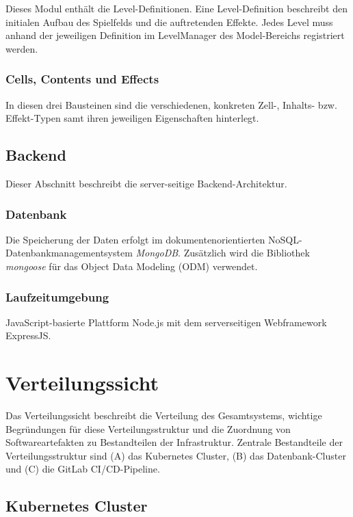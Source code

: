 \documentclass[letterpaper, 10 pt, conference]{ieeeconf}
\begin{document}
Dieses Modul enthält die Level-Definitionen.
Eine Level-Definition beschreibt den initialen Aufbau des Spielfelds und die auftretenden Effekte.
Jedes Level muss anhand der jeweiligen Definition im LevelManager des Model-Bereichs registriert werden.

\subsubsection{Cells, Contents und Effects}

In diesen drei Bausteinen sind die verschiedenen, konkreten Zell-, Inhalts- bzw. Effekt-Typen samt ihren jeweiligen Eigenschaften hinterlegt.

\subsection{Backend}
Dieser Abschnitt beschreibt die server-seitige Backend-Architektur.

\subsubsection{Datenbank} \label{datenbank}

Die Speicherung der Daten erfolgt im dokumentenorientierten NoSQL-Datenbankmanagementsystem \textit{MongoDB}.  Zusätzlich wird die Bibliothek  \textit{mongoose} für das Object Data Modeling (ODM) verwendet.  \\

\subsubsection{Laufzeitumgebung}

JavaScript-basierte Plattform Node.js mit dem serverseitigen Webframework ExpressJS.

\section{Verteilungssicht}
Das Verteilungssicht beschreibt die Verteilung des Gesamtsystems,  wichtige Begründungen für diese Verteilungsstruktur und die Zuordnung von Softwareartefakten zu Bestandteilen der Infrastruktur.
Zentrale Bestandteile der Verteilungsstruktur sind (A) das Kubernetes Cluster,  (B) das Datenbank-Cluster und (C) die GitLab CI/CD-Pipeline.

\subsection{Kubernetes Cluster}
\end{document}
